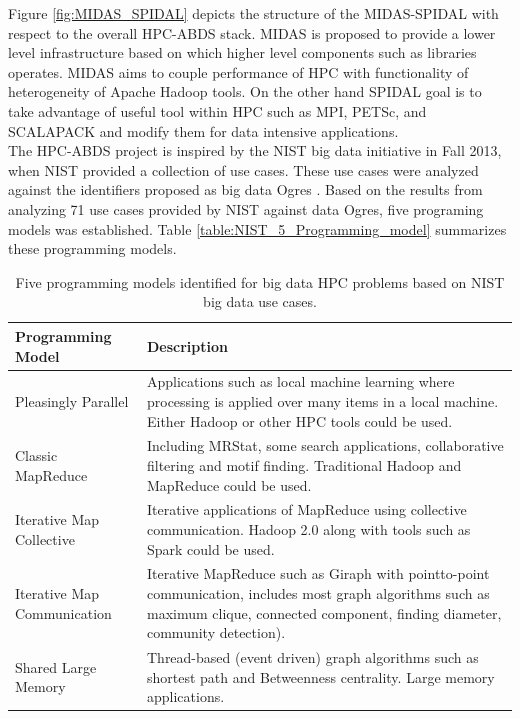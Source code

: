 \documentclass[runningheads,a4paper]{llncs}
\begin{document}
{Figure \ref{fig:MIDAS_SPIDAL} depicts the structure of the MIDAS-SPIDAL with respect to the overall HPC-ABDS stack. MIDAS is proposed to provide a lower level infrastructure based on which higher level components such as libraries operates. MIDAS aims to couple performance of HPC with functionality of heterogeneity of Apache Hadoop tools. On the other hand SPIDAL goal is to take advantage of useful tool within HPC such as MPI, PETSc, and SCALAPACK and modify them for data intensive applications.\\

The HPC-ABDS project is inspired by the NIST big data initiative in Fall 2013, when NIST provided a collection of use cases. These use cases were analyzed against the identifiers proposed as big data Ogres \cite{fox2014towards}. Based on the results from analyzing 71 use cases provided by NIST against data Ogres, five programing models was established. Table \ref{table:NIST_5_Programming_model} summarizes these programming models. 

\begin{table}
	\centering
	\caption{Five programming models identified for big data HPC problems based on NIST big data use cases.}
	\begin{tabular}{ |p{4cm}|p{7cm}|  }
		\hline
		\textbf{Programming Model} & \textbf{Description} \\
		\hline
		Pleasingly Parallel & Applications such as local machine learning where processing is applied over many items in a local machine. Either Hadoop or other HPC tools could be used. \\
		\hline
		Classic MapReduce & Including MRStat, some search applications, collaborative filtering and motif finding. Traditional Hadoop and MapReduce could be used.\\
		\hline
		Iterative Map Collective & Iterative applications of MapReduce using collective communication. Hadoop 2.0 along with tools such as Spark could be used.\\
		\hline
		Iterative Map Communication & Iterative MapReduce such as Giraph with pointto-point
		communication, includes most graph algorithms
		such as maximum clique, connected
		component, finding diameter, community detection).
		 \\
		\hline
		Shared Large Memory & Thread-based (event driven) graph algorithms
		such as shortest path and Betweenness centrality.
		Large memory applications.\\
		\hline
		

\end{tabular}
\end{table}}
\end{document}
